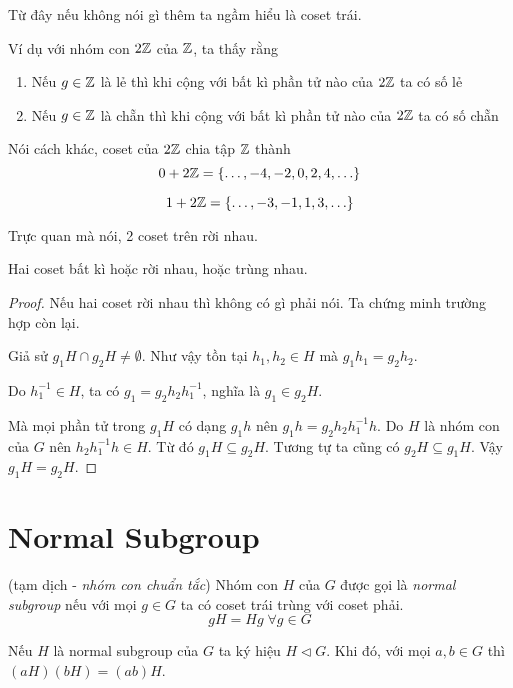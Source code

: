 Từ đây nếu không nói gì thêm ta ngầm hiểu là coset trái.

Ví dụ với nhóm con $2\mathbb{Z}$ của $\mathbb{Z}$, ta thấy rằng

\begin{enumerate}
    \item Nếu $g \in \mathbb{Z}$ là lẻ thì khi cộng với bất kì phần tử nào của $2\mathbb{Z}$ ta có số lẻ
    \item Nếu $g \in \mathbb{Z}$ là chẵn thì khi cộng với bất kì phần tử nào của $2\mathbb{Z}$ ta có số chẵn
\end{enumerate}

Nói cách khác, coset của $2\mathbb{Z}$ chia tập $\mathbb{Z}$ thành
\[0 + 2\mathbb{Z} = \{\ldots, -4, -2, 0, 2, 4, \ldots\}\]
 
\[1 + 2\mathbb{Z} = \{\ldots, -3, -1, 1, 3, \ldots \}\]

Trực quan mà nói, 2 coset trên rời nhau.

\begin{remark}
    Hai coset bất kì hoặc rời nhau, hoặc trùng nhau.
\end{remark}

\begin{proof}
    Nếu hai coset rời nhau thì không có gì phải nói. Ta chứng minh trường hợp còn lại.

    Giả sử $g_1 H \cap g_2 H \neq \emptyset$. Như vậy tồn tại $h_1, h_2 \in H$ mà $g_1 h_1 = g_2 h_2$.

    Do $h_1^{-1} \in H$, ta có $g_1 = g_2 h_2 h_1^{-1}$, nghĩa là $g_1 \in g_2 H$.

    Mà mọi phần tử trong $g_1 H$ có dạng $g_1 h$ nên $g_1 h = g_2 h_2 h_1^{-1} h$. Do $H$ là nhóm con của $G$ nên $h_2 h_1^{-1} h \in H$.
    Từ đó $g_1 H \subseteq g_2 H$. Tương tự ta cũng có $g_2 H \subseteq g_1 H$. Vậy $g_1 H = g_2 H$.
\end{proof}

\section{Normal Subgroup}

\begin{definition}
    (tạm dịch - \textit{nhóm con chuẩn tắc}) Nhóm con $H$ của $G$ được gọi là \textit{normal subgroup} nếu với mọi $g \in G$ ta có coset trái trùng với coset phải.
    \[gH = Hg \; \forall g \in G\]
\end{definition}

Nếu $H$ là normal subgroup của $G$ ta ký hiệu $H \triangleleft G$. Khi đó, với mọi
$a, b \in G$ thì $(a H) (b H) = (ab) H$.

